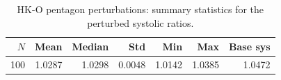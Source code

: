 \begin{table}[h]
\centering
\begin{tabular}{rrrrrrr}
\toprule
$N$ & Mean & Median & Std & Min & Max & Base sys \\
\midrule
100 & 1.0287 & 1.0298 & 0.0048 & 1.0142 & 1.0385 & 1.0472 \\
\bottomrule
\end{tabular}
\caption{HK-O pentagon perturbations: summary statistics for the perturbed systolic ratios.}
\label{tab:pentagon-perturb-stats}
\end{table}
